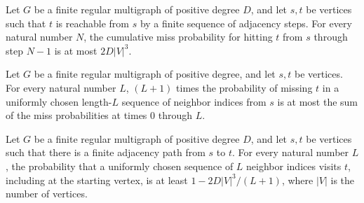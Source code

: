 \begin{theorem}
\label{Randomized.RegularMultigraph.hitTime_le}
\leanok
{}
Let $G$ be a finite regular multigraph of positive degree $D$, and let $s,t$ be vertices
such that $t$ is reachable from $s$ by a finite sequence of adjacency steps. For every
natural number $N$, the cumulative miss probability for hitting $t$ from $s$ through
step $N-1$ is at most $2D|V|^3$.
\end{theorem}

\begin{theorem}
\label{Randomized.RegularMultigraph.succ_mul_missProb_le}
\leanok
{}
Let $G$ be a finite regular multigraph of positive degree, and let $s,t$ be vertices.
For every natural number $L$, $(L+1)$ times the probability of missing $t$ in a
uniformly chosen length-$L$ sequence of neighbor indices from $s$ is at most the sum of
the miss probabilities at times $0$ through $L$.
\end{theorem}

\begin{theorem}
\label{Randomized.RegularMultigraph.one_sub_le_hitProb}
\leanok
{}
Let $G$ be a finite regular multigraph of positive degree $D$, and let $s,t$ be vertices
such that there is a finite adjacency path from $s$ to $t$. For every natural number
$L$, the probability that a uniformly chosen sequence of $L$ neighbor indices visits
$t$, including at the starting vertex, is at least $1-2D|V|^3/(L+1)$, where $|V|$ is the
number of vertices.
\end{theorem}

